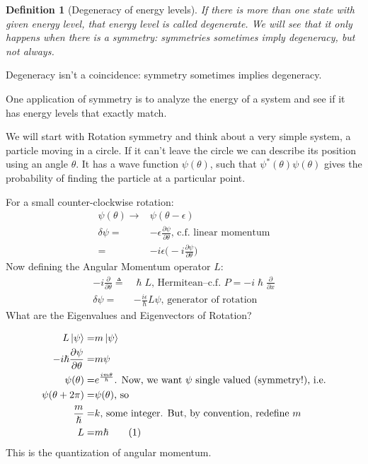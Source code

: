 \documentclass[]{article}
\newcommand\numberthis{\addtocounter{equation}{1}\tag{\theequation}}
\newtheorem{defn}[thm]{Definition}
\begin{document}
\begin{defn}[Degeneracy of energy levels]
	If there is more than one state with given energy level, that energy level is called degenerate. We will see that it only happens when there is a symmetry: symmetries sometimes imply degeneracy, but not always.
\end{defn}

Degeneracy isn't a coincidence: symmetry sometimes implies degeneracy.

One application of symmetry is to analyze the energy of a system and see if it has energy levels that exactly match.


We will start with Rotation symmetry and think about a very simple system, a particle moving in a circle. If it can't leave the circle we can describe its position using an angle $\theta$. It has a wave function $\psi(\theta)$, such that $\psi^*(\theta)\psi(\theta)$ gives the probability of finding the particle at a particular point.

For a small counter-clockwise rotation:
\begin{align*}
\psi(\theta) \rightarrow & \psi(\theta - \epsilon)\\
\delta\psi =& - \epsilon \frac{\partial \psi}{\partial \theta} \text{, c.f. linear momentum}\\
=& -i \epsilon \big(-i \frac{\partial \psi}{\partial \theta}\big)
\end{align*}
Now defining the Angular Momentum operator $L$:
\begin{align}
- i \frac{\partial}{\partial \theta} \triangleq&\hslash L \text{, Hermitean--c.f. $P=-i\hslash \frac{\partial}{\partial x}$}\\
\delta\psi =& - \frac{i \epsilon}{\hslash} L \psi \text{, generator of rotation}
\end{align}
What are the Eigenvalues and Eigenvectors of Rotation?

\begin{align*}
L\ket{\psi} =& m \ket{\psi}\\
-i \hslash \frac{\partial \psi}{\partial \theta} =& m \psi\\
\psi(\theta) =& e^{\frac{i m \theta}{\hslash}}\text{. Now, we want $\psi$ single valued (symmetry!), i.e.}\\
\psi(\theta + 2\pi) =& \psi(\theta) \text{, so}\\
\frac{m}{\hslash}=&k\text{, some integer. But, by convention, redefine $m$}\\
L=& m \hslash \numberthis \label{eq:magnetic:quantum:number}
\end{align*}
This is the quantization of angular momentum.
\end{document}

